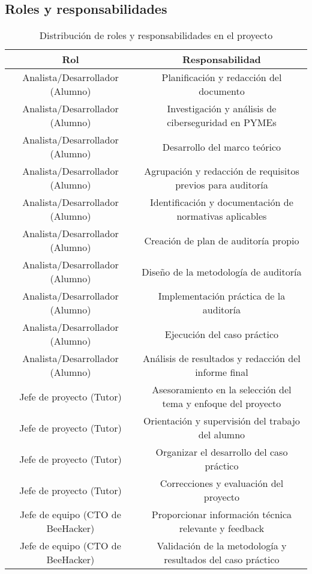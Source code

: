 \documentclass[a4paper, 10pt]{article}
\begin{document}
\subsection{Roles y responsabilidades}

\begin{table}[H]
    \centering
    \begin{tabular}{|c|c|}

        \hline
        \textbf{Rol} & \textbf{Responsabilidad} \\
        \hline
        Analista/Desarrollador (Alumno) & Planificación y redacción del documento \\
        \hline
        Analista/Desarrollador (Alumno) & Investigación y análisis de ciberseguridad en PYMEs \\
        \hline
        Analista/Desarrollador (Alumno) & Desarrollo del marco teórico \\
        \hline
        Analista/Desarrollador (Alumno) & Agrupación y redacción de requisitos previos para auditoría \\
        \hline
        Analista/Desarrollador (Alumno) & Identificación y documentación de normativas aplicables \\
        \hline
        Analista/Desarrollador (Alumno) & Creación de plan de auditoría propio \\
        \hline
        Analista/Desarrollador (Alumno) & Diseño de la metodología de auditoría \\
        \hline
        Analista/Desarrollador (Alumno) & Implementación práctica de la auditoría \\
        \hline
        Analista/Desarrollador (Alumno) & Ejecución del caso práctico \\
        \hline
        Analista/Desarrollador (Alumno) & Análisis de resultados y redacción del informe final \\
        \hline
        Jefe de proyecto (Tutor) & Asesoramiento en la selección del tema y enfoque del proyecto \\
        \hline
        Jefe de proyecto (Tutor) & Orientación y supervisión del trabajo del alumno \\
        \hline
        Jefe de proyecto (Tutor) & Organizar el desarrollo del caso práctico \\
        \hline
        Jefe de proyecto (Tutor) & Correcciones y evaluación del proyecto \\
        \hline
        Jefe de equipo (CTO de BeeHacker) & Proporcionar información técnica relevante y feedback \\
        \hline
        Jefe de equipo (CTO de BeeHacker) & Validación de la metodología y resultados del caso práctico \\
        \hline

    \end{tabular}
    \caption{Distribución de roles y responsabilidades en el proyecto}
    \label{tab:distribucion_roles}
\end{table}
\end{document}
